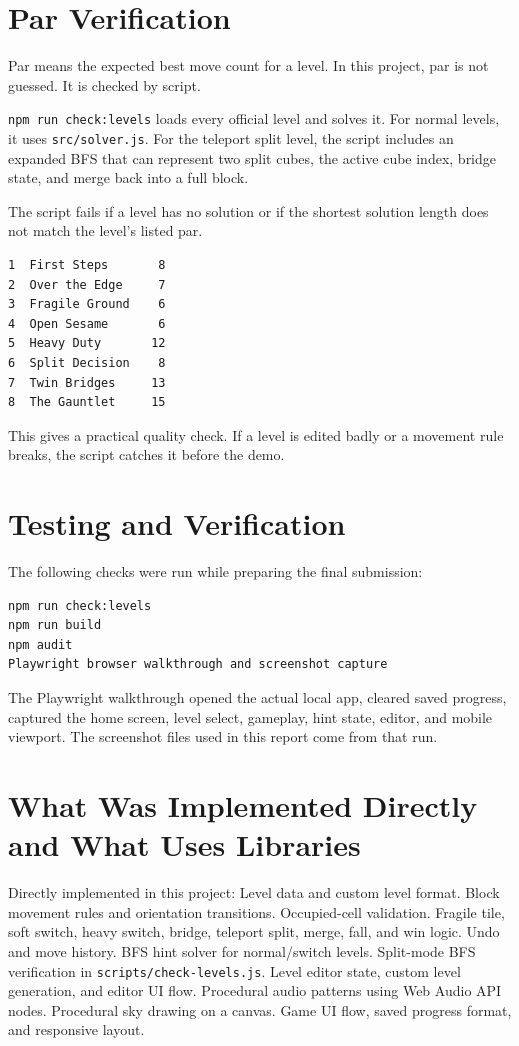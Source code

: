 \documentclass[11pt,a4paper]{article}
\newcommand{\code}[1]{\texttt{#1}}
\begin{document}
\section{Par Verification}

Par means the expected best move count for a level. In this project, par is not guessed. It is checked by script.

\code{npm run check:levels} loads every official level and solves it. For normal levels, it uses \code{src/solver.js}. For the teleport split level, the script includes an expanded BFS that can represent two split cubes, the active cube index, bridge state, and merge back into a full block.

The script fails if a level has no solution or if the shortest solution length does not match the level's listed par.

\begin{lstlisting}
1  First Steps       8
2  Over the Edge     7
3  Fragile Ground    6
4  Open Sesame       6
5  Heavy Duty       12
6  Split Decision    8
7  Twin Bridges     13
8  The Gauntlet     15
\end{lstlisting}

This gives a practical quality check. If a level is edited badly or a movement rule breaks, the script catches it before the demo.

\section{Testing and Verification}

The following checks were run while preparing the final submission:

\begin{lstlisting}
npm run check:levels
npm run build
npm audit
Playwright browser walkthrough and screenshot capture
\end{lstlisting}

The Playwright walkthrough opened the actual local app, cleared saved progress, captured the home screen, level select, gameplay, hint state, editor, and mobile viewport. The screenshot files used in this report come from that run.

\section{What Was Implemented Directly and What Uses Libraries}

Directly implemented in this project:
Level data and custom level format.
Block movement rules and orientation transitions.
Occupied-cell validation.
Fragile tile, soft switch, heavy switch, bridge, teleport split, merge, fall, and win logic.
Undo and move history.
BFS hint solver for normal/switch levels.
Split-mode BFS verification in \code{scripts/check-levels.js}.
Level editor state, custom level generation, and editor UI flow.
Procedural audio patterns using Web Audio API nodes.
Procedural sky drawing on a canvas.
Game UI flow, saved progress format, and responsive layout.
\end{document}

